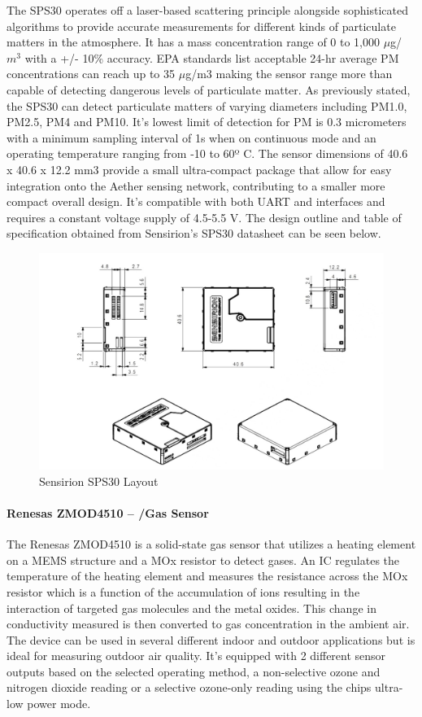 The SPS30 operates off a laser-based scattering principle alongside sophisticated algorithms to provide accurate measurements for different kinds of particulate matters in the atmosphere. It has a mass concentration range of 0 to 1,000 $\mu$g/$m^3$ with a +/- 10\% accuracy. EPA standards list acceptable 24-hr average PM concentrations can reach up to 35 $\mu$g/m3 making the sensor range more than capable of detecting dangerous levels of particulate matter. As previously stated, the SPS30 can detect particulate matters of varying diameters including PM1.0, PM2.5, PM4 and PM10. It’s lowest limit of detection for PM is 0.3 micrometers with a minimum sampling interval of 1s when on continuous mode and an operating temperature ranging from -10 to 60º C. The sensor dimensions of 40.6 x 40.6 x 12.2 mm3 provide a small ultra-compact package that allow for easy integration onto the Aether sensing network, contributing to a smaller more compact overall design. It’s compatible with both UART and \iic interfaces and requires a constant voltage supply of 4.5-5.5 V. The design outline and table of specification obtained from Sensirion’s SPS30 datasheet can be seen below.


\begin{figure}
\centering
\includegraphics[width=6in]{figures/PM sensor layout.jpg}
\caption{Sensirion SPS30 Layout}
\label{fig:Renesas Sensor Op}
\end{figure}

\paragraph{Renesas ZMOD4510 – \ndo/\ozone Gas Sensor }
The Renesas ZMOD4510 is a solid-state gas sensor that utilizes a heating element on a MEMS structure and a MOx resistor to detect gases. An IC regulates the temperature of the heating element and measures the resistance across the MOx resistor which is a function of the accumulation of ions resulting in the interaction of targeted gas molecules and the metal oxides. This change in conductivity measured is then converted to gas concentration in the ambient air. The device can be used in several different indoor and outdoor applications but is ideal for measuring outdoor air quality. It’s equipped with 2 different sensor outputs based on the selected operating method, a non-selective ozone and nitrogen dioxide reading or a selective ozone-only reading using the chips ultra-low power mode.

